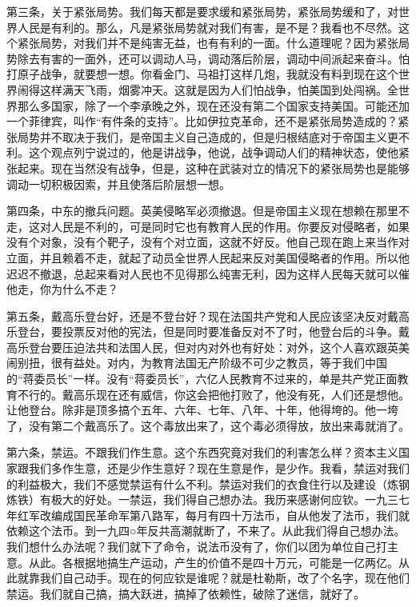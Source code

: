 第三条，关于紧张局势。我们每天都是要求缓和紧张局势，紧张局势缓和了，对世界人民是有利的。那么，凡是紧张局势就对我们有害，是不是？我看也不尽然。这个紧张局势，对我们并不是纯害无益，也有有利的一面。什么道理呢？因为紧张局势除去有害的一面外，还可以调动人马，调动落后阶层，调动中间派起来奋斗。怕打原子战争，就要想一想。你看金门、马祖打这样几炮，我就没有料到现在这个世界闹得这样满天飞雨，烟雾冲天。这就是因为人们怕战争，怕美国到处闯祸。全世界那么多国家，除了一个李承晚之外，现在还没有第二个国家支持美国。可能还加一个菲律宾，叫作“有件条的支持”。比如伊拉克革命，还不是紧张局势造成的？紧张局势并不取决于我们，是帝国主义自己造成的，但是归根结底对于帝国主义更不利。这个观点列宁说过的，他是讲战争，他说，战争调动人们的精神状态，使他紧张起来。现在当然没有战争，但是，这种在武装对立的情况下的紧张局势也是能够调动一切积极因索，并且使落后阶层想一想。

第四条，中东的撤兵问题。英美侵略军必须撤退。但是帝国主义现在想赖在那里不走，这对人民是不利的，可是同时它也有教育人民的作用。你要反对侵略者，如果没有个对象，没有个靶子，没有个对立面，这就不好反。他自己现在跑上来当作对立面，并且赖着不走，就起了动员全世界人民起来反对美国侵略者的作用。所以他迟迟不撤退，总起来看对人民也不见得那么纯害无利，因为这样人民每天就可以催他走，你为什么不走？

第五条，戴高乐登台好，还是不登台好？现在法国共产党和人民应该坚决反对戴高乐登台，要投票反对他的宪法，但是同时要准备反对不了时，他登台后的斗争。戴高乐登台要压迫法共和法国人民，但对内对外也有好处：对外，这个人喜欢跟英美闹别扭，很有益处。对内，为教育法国无产阶级不可少之教员，等于我们中国的“蒋委员长”一样。没有“蒋委员长”，六亿人民教育不过来的，单是共产党正面教育不行的。戴高乐现在还有威信，你这会把他打败了，他没有死，人们还是想他。让他登台。除非是顶多搞个五年、六年、七年、八年、十年，他得垮的。他一垮了，没有第二个戴高乐了。这个毒放出来了，这个毒必须得放，放出来毒就消了。

第六条，禁运。不跟我们作生意。这个东西究竟对我们的利害怎么样？资本主义国家跟我们多作生意，还是少作生意好？现在生意是作，是少作。我看，禁运对我们的利益极大，我们不感觉禁运有什么不利。禁运对我们的衣食住行以及建设（炼钢炼铁）有极大的好处。一禁运，我们得自己想办法。我历来感谢何应钦。一九三七年红军改编成国民革命军第八路军，每月有四十万法币，自从他发了法币，我们就依赖这个法币。到一九四○年反共高潮就断了，不来了。从此我们得自己想办法。我们想什么办法呢？我们就下了命令，说法币没有了，你们以团为单位自己打主意。从此。各根据地搞生产运动，产生的价值不是四十万元，可能是一亿两亿。从此就靠我们自己动手。现在的何应钦是谁呢？就是杜勒斯，改了个名字，现在他们禁运。我们就自己搞，搞大跃进，搞掉了依赖性，破除了迷信，就好了。

